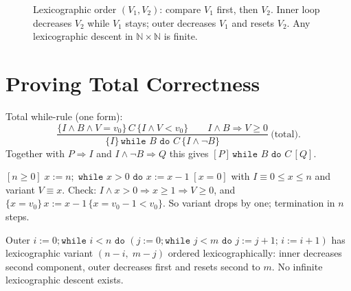 \begin{figure}[h]\centering
{}
\caption{Lexicographic order $(V_1,V_2)$: compare $V_1$ first, then $V_2$. Inner loop decreases $V_2$ while $V_1$ stays; outer decreases $V_1$ and resets $V_2$. Any lexicographic descent in $\mathbb{N}\times\mathbb{N}$ is finite.}
\label{fig:lexicographic}
\end{figure}

\section{Proving Total Correctness}
\label{sec:proving-total}
Total while-rule (one form):
\[
\frac{\{I\land B\land V=v_0\}\,C\,\{I\land V<v_0\}\qquad I\land B\Rightarrow V\ge0}{\{I\}\,\texttt{while }B\texttt{ do }C\,\{I\land\neg B\}}\ \text{(total)}.
\]
Together with $P\Rightarrow I$ and $I\land\neg B\Rightarrow Q$ this gives $[P]\,\texttt{while }B\texttt{ do }C\,[Q]$.

\begin{example}[Countdown]
$[n\ge0]\;x:=n;\;\texttt{while }x>0\texttt{ do }x:=x-1\;[x=0]$ with $I\equiv0\le x\le n$ and variant $V\equiv x$. Check: $I\land x>0\Rightarrow x\ge1\Rightarrow V\ge0$, and $\{x=v_0\}\,x:=x-1\,\{x=v_0-1 < v_0\}$. So variant drops by one; termination in $n$ steps.
\end{example}

\begin{example}
Outer $i:=0;\texttt{while }i<n\texttt{ do }(j:=0;\texttt{while }j<m\texttt{ do }j:=j+1;\,i:=i+1)$ has lexicographic variant $(n-i,\; m-j)$ ordered lexicographically: inner decreases second component, outer decreases first and resets second to $m$. No infinite lexicographic descent exists.
\end{example}

